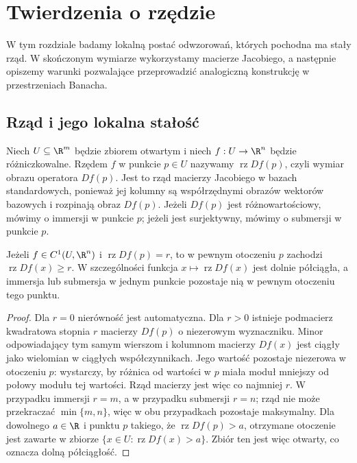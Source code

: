 \chapter{Twierdzenia o rzędzie}
\label{ma2:ch:rank}

W tym rozdziale badamy lokalną postać odwzorowań,
których pochodna ma stały rząd. W skończonym wymiarze
wykorzystamy macierze Jacobiego, a następnie opiszemy
warunki pozwalające przeprowadzić analogiczną konstrukcję
w przestrzeniach Banacha.

\section{Rząd i jego lokalna stałość}

\begin{definicja}
\label{ma2:def:rank}
Niech $U\subseteq\R^m$ będzie zbiorem otwartym i
niech $f:U\to\R^n$ będzie różniczkowalne. Rzędem $f$ w punkcie
$p\in U$ nazywamy $\operatorname{rz}Df(p)$, czyli
wymiar obrazu operatora $Df(p)$. Jest to rząd
macierzy Jacobiego w bazach standardowych, ponieważ
jej kolumny są współrzędnymi obrazów wektorów bazowych
i rozpinają obraz $Df(p)$.
Jeżeli $Df(p)$ jest różnowartościowy, mówimy
o immersji w punkcie $p$; jeżeli jest surjektywny,
mówimy o submersji w punkcie $p$.
\end{definicja}

\begin{stwierdzenie}
\label{ma2:prop:rank-lower}
Jeżeli $f\in C^1(U,\R^n)$ i
$\operatorname{rz}Df(p)=r$, to w pewnym otoczeniu $p$
zachodzi $\operatorname{rz}Df(x)\ge r$.
W szczególności funkcja $x\mapsto\operatorname{rz}Df(x)$
jest dolnie półciągła, a immersja lub submersja w jednym
punkcie pozostaje nią w pewnym otoczeniu tego punktu.
\end{stwierdzenie}
\begin{proof}
Dla $r=0$ nierówność jest automatyczna. Dla $r>0$
istnieje podmacierz kwadratowa stopnia $r$ macierzy
$Df(p)$ o niezerowym wyznaczniku. Minor odpowiadający
tym samym wierszom i kolumnom macierzy $Df(x)$ jest
ciągły jako wielomian w ciągłych współczynnikach.
Jego wartość pozostaje niezerowa w otoczeniu $p$:
wystarczy, by różnica od wartości w $p$ miała moduł
mniejszy od połowy modułu tej wartości.
Rząd macierzy jest więc co najmniej $r$.
W przypadku immersji $r=m$, a w przypadku submersji
$r=n$; rząd nie może przekraczać $\min\{m,n\}$,
więc w obu przypadkach pozostaje maksymalny.
Dla dowolnego $a\in\R$ i punktu $p$ takiego, że
$\operatorname{rz}Df(p)>a$, otrzymane otoczenie jest
zawarte w zbiorze $\{x\in U:\operatorname{rz}Df(x)>a\}$.
Zbiór ten jest więc otwarty, co oznacza dolną półciągłość.
\end{proof}

